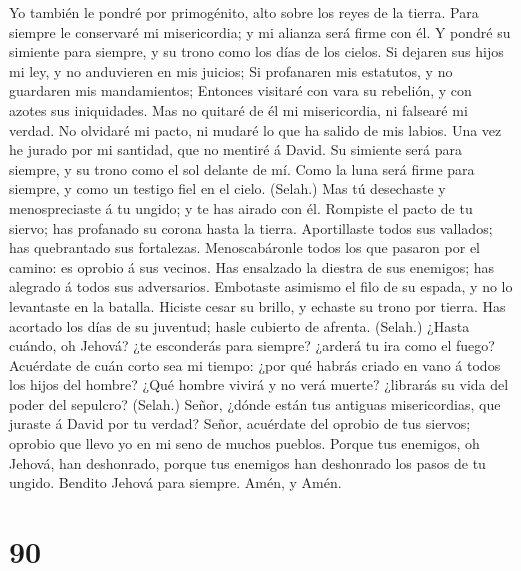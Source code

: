 Yo también le pondré por primogénito, alto sobre los reyes de la tierra.
 Para siempre le conservaré mi misericordia; y mi alianza
será firme con él.  Y pondré su simiente para siempre, y su
trono como los días de los cielos.  Si dejaren sus hijos mi
ley, y no anduvieren en mis juicios;  Si profanaren mis
estatutos, y no guardaren mis mandamientos;  Entonces
visitaré con vara su rebelión, y con azotes sus iniquidades.
 Mas no quitaré de él mi misericordia, ni falsearé mi
verdad.  No olvidaré mi pacto, ni mudaré lo que ha salido
de mis labios.  Una vez he jurado por mi santidad, que no
mentiré á David.  Su simiente será para siempre, y su trono
como el sol delante de mí.  Como la luna será firme para
siempre, y como un testigo fiel en el cielo. (Selah.)  Mas
tú desechaste y menospreciaste á tu ungido; y te has airado con él.
 Rompiste el pacto de tu siervo; has profanado su corona
hasta la tierra.  Aportillaste todos sus vallados; has
quebrantado sus fortalezas.  Menoscabáronle todos los que
pasaron por el camino: es oprobio á sus vecinos.  Has
ensalzado la diestra de sus enemigos; has alegrado á todos sus
adversarios.  Embotaste asimismo el filo de su espada, y no
lo levantaste en la batalla.  Hiciste cesar su brillo, y
echaste su trono por tierra.  Has acortado los días de su
juventud; hasle cubierto de afrenta. (Selah.)  ¿Hasta
cuándo, oh Jehová? ¿te esconderás para siempre? ¿arderá tu ira como el
fuego?  Acuérdate de cuán corto sea mi tiempo: ¿por qué
habrás criado en vano á todos los hijos del hombre?  ¿Qué
hombre vivirá y no verá muerte? ¿librarás su vida del poder del
sepulcro? (Selah.)  Señor, ¿dónde están tus antiguas
misericordias, que juraste á David por tu verdad?  Señor,
acuérdate del oprobio de tus siervos; oprobio que llevo yo en mi seno de
muchos pueblos.  Porque tus enemigos, oh Jehová, han
deshonrado, porque tus enemigos han deshonrado los pasos de tu ungido.
 Bendito Jehová para siempre. Amén, y Amén.

\hypertarget{section-89}{%
\section{90}\label{section-89}}

